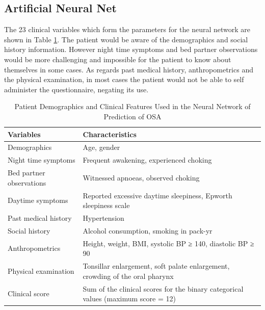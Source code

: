 \subsection{Artificial Neural Net}
The 23 clinical variables which form the parameters for the neural network are shown in Table \ref{table:neural}. The patient would be aware of the demographics and social history information. However night time symptoms and bed partner observations would be more challenging and impossible for the patient to know about themselves in some cases. As regards past medical history, anthropometrics and the physical examination, in most cases the patient would not be able to self administer the questionnaire, negating its use.
\begin{table}[h]
\centering
\begin{tabular}{p{5cm} p{10cm}}
\toprule
Variables&Characteristics\\ \midrule
Demographics&Age, gender\\ 
Night time symptoms&Frequent awakening, experienced choking\\ 
Bed partner observations&Witnessed apnoeas, observed choking\\ 
Daytime symptoms&Reported excessive daytime sleepiness, Epworth sleepiness scale\\ 
Past medical history&Hypertension\\ 
Social history&Alcohol consumption, smoking in pack-yr\\ 
Anthropometrics&Height, weight, BMI, systolic BP ≥ 140, diastolic BP ≥ 90\\ 
Physical examination&Tonsillar enlargement, soft palate enlargement, crowding of the oral pharynx\\ 
Clinical score&Sum of the clinical scores for the binary categorical values (maximum score = 12)\\ \bottomrule
\end{tabular}
\caption{Patient Demographics and Clinical Features Used in the Neural Network of Prediction of OSA}
\label{table:neural}
\end{table} 

